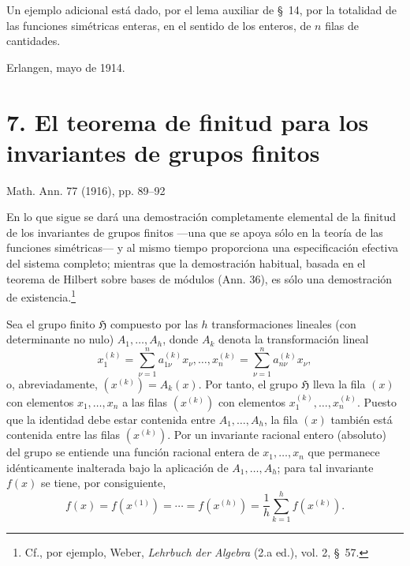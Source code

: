 \documentclass[11pt]{article}
\providecommand{\Hgrp}{\mathfrak{H}}
\begin{document}
Un ejemplo adicional está dado, por el lema auxiliar de \S\ 14, por la totalidad de las funciones simétricas enteras, en el sentido de los enteros, de $n$ filas de cantidades.

Erlangen, mayo de 1914.

\section*{7. El teorema de finitud para los invariantes de grupos finitos}
\begin{center}
Math. Ann. 77 (1916), pp. 89--92
\end{center}

En lo que sigue se dará una demostración completamente elemental de la finitud de los invariantes de grupos finitos ---una que se apoya sólo en la teoría de las funciones simétricas--- y al mismo tiempo proporciona una especificación efectiva del sistema completo; mientras que la demostración habitual, basada en el teorema de Hilbert sobre bases de módulos (Ann. 36), es sólo una demostración de existencia.\footnote{Cf., por ejemplo, Weber, \emph{Lehrbuch der Algebra} (2.a ed.), vol. 2, \S\ 57.}

Sea el grupo finito $\Hgrp$ compuesto por las $h$ transformaciones lineales (con determinante no nulo) $A_1,\ldots,A_h$, donde $A_k$ denota la transformación lineal
\[
  x_1^{(k)}=\sum_{\nu=1}^{n}a_{1\nu}^{(k)}x_\nu,\ldots,
  x_n^{(k)}=\sum_{\nu=1}^{n}a_{n\nu}^{(k)}x_\nu,
\]
o, abreviadamente, $(x^{(k)})=A_k(x)$. Por tanto, el grupo $\Hgrp$ lleva la fila $(x)$ con elementos $x_1,
\ldots,x_n$ a las filas $(x^{(k)})$ con elementos $x_1^{(k)},
\ldots,x_n^{(k)}$. Puesto que la identidad debe estar contenida entre $A_1,
\ldots,A_h$, la fila $(x)$ también está contenida entre las filas $(x^{(k)})$. Por un invariante racional entero (absoluto) del grupo se entiende una función racional entera de $x_1,
\ldots,x_n$ que permanece idénticamente inalterada bajo la aplicación de $A_1,
\ldots,A_h$; para tal invariante $f(x)$ se tiene, por consiguiente,
\begin{equation}
  f(x)=f(x^{(1)})=\cdots=f(x^{(h)})=
  \frac1h\sum_{k=1}^{h}f(x^{(k)}).
\tag{1}
\end{equation}
\end{document}
